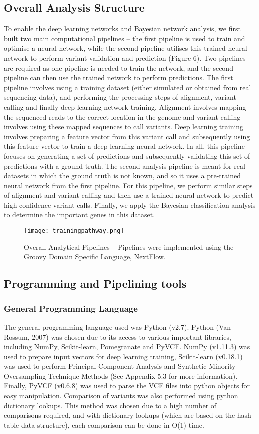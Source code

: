 \documentclass{article}
\begin{document}
\subsection{Overall Analysis Structure}
To enable the deep learning networks and Bayesian network analysis, we first built two main computational pipelines -- the first pipeline is used to train and optimise a neural network, while the second pipeline utilises this  trained neural network to perform variant validation and prediction (Figure 6). Two pipelines are required as one pipeline is needed to train the network, and the second pipeline can then use the trained network to perform predictions. The first pipeline involves using a training dataset (either simulated or obtained from real sequencing data), and performing the processing steps of alignment, variant calling and finally deep learning network training. Alignment involves mapping the sequenced reads to the correct location in the genome and variant calling involves using these mapped sequences to call variants. Deep learning training involves preparing a feature vector from this variant call and subsequently using this feature vector to train a deep learning neural network. In all, this pipeline focuses on generating a set of predictions and subsequently validating this set of predictions with a ground truth. The second analysis pipeline is meant for real datasets in which the ground truth is not known, and so it uses a pre-trained neural network from the first pipeline. For this pipeline, we perform similar steps of alignment and variant calling and then use a trained neural network to predict high-confidence variant calls. Finally, we apply the Bayesian classification analysis to determine the important genes in this dataset.

\begin{figure}[H]
\texttt{[image: trainingpathway.png]}
\centering
\caption{Overall Analytical Pipelines -- Pipelines were implemented using the Groovy Domain Specific Language, NextFlow.}
\end{figure}

\subsection{Programming and Pipelining tools}
\subsubsection{General Programming Language}
The general programming language used was Python (v2.7). Python (Van Rossum, 2007) was chosen due to its access to various important libraries, including NumPy, Scikit-learn, Pomegranate and PyVCF. NumPy (v1.11.3) was used to prepare input vectors for deep learning training, Scikit-learn (v0.18.1) was used to perform Principal Component Analysis and Synthetic Minority Oversampling Technique Methods (See Appendix 5.3 for more information). Finally, PyVCF (v0.6.8) was used to parse the VCF files into python objects for easy manipulation. Comparison of variants was also performed using python dictionary lookups. This method was chosen due to a high number of comparisons required, and with dictionary lookups (which are based on the hash table data-structure), each comparison can be done in O(1) time.
\end{document}
